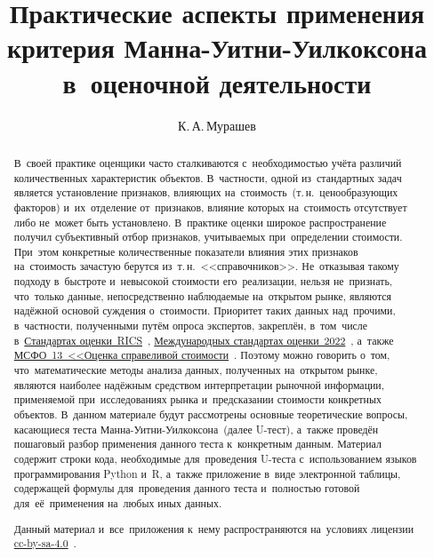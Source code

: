 \documentclass[]{scrartcl}
\title{Практические аспекты применения критерия Манна-Уитни-Уилкоксона в~оценочной деятельности}
\author{К.\,А.\,Мурашев}
\begin{document}
\maketitle

\begin{abstract}
В~своей практике оценщики часто сталкиваются с~необходимостью учёта различий количественных характеристик объектов. В~частности, одной из~стандартных задач является установление признаков, влияющих на~стоимость~(т.\,н.~ценообразующих факторов) и~их~отделение от~признаков, влияние которых на~стоимость отсутствует либо не~может быть установлено. В~практике оценки широкое распространение получил субъективный отбор признаков, учитываемых при~определении стоимости. При~этом конкретные количественные показатели влияния этих признаков на~стоимость зачастую берутся из~т.\,н.~<<справочников>>. Не~отказывая такому подходу в~быстроте и~невысокой стоимости его~реализации, нельзя не~признать, что~только данные, непосредственно наблюдаемые на~открытом рынке, являются надёжной основой суждения о~стоимости. Приоритет таких данных над~прочими, в~частности, полученными путём опроса экспертов, закреплён, в~том~числе в~\href{https://www.rics.org/uk/upholding-professional-standards/sector-standards/valuation/red-book/red-book-global/}{Стандартах оценки~RICS}~\cite{RVGS-2022}, \href{https://www.rics.org/uk/upholding-professional-standards/sector-standards/valuation/red-book/international-valuation-standards/}{Международных стандартах оценки~2022}~\cite{IVS-2022}, а~также \href{https://normativ.kontur.ru/document?moduleId=1&documentId=326168#l0}{МСФО~13~<<Оценка справеливой стоимости}~\cite{MSFO-13}. Поэтому можно говорить о~том, что~математические методы анализа данных, полученных на~открытом рынке, являются наиболее надёжным средством интерпретации рыночной информации, применяемой при~исследованиях рынка и~предсказании стоимости конкретных объектов. В~данном материале будут рассмотрены основные теоретические вопросы, касающиеся теста Манна-Уитни-Уилкоксона~(далее U-тест), а~также проведён пошаговый разбор применения данного теста к~конкретным данным. Материал содержит строки кода, необходимые для~проведения U-теста с~использованием языков программирования Python и~R, а~также приложение в~виде электронной таблицы, содержащей формулы для~проведения данного теста и~полностью готовой для~её~применения на~любых иных данных.

Данный материал и~все~приложения к~нему распространяются на~условиях лицензии \href{https://creativecommons.org/licenses/by-sa/4.0/}{cc-by-sa-4.0}~\cite{cc-by-sa-4.0}.
\end{abstract}
\end{document}
